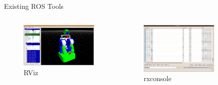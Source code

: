 \documentclass[compress]{beamer}
\begin{document}
\begin{frame}{Existing ROS Tools}
\begin{columns}
\begin{column}{.4\textwidth}
\begin{figure}[t]
    \centering
    \includegraphics[width=.9\textwidth]{images/RVizRobotModel.png}
    \caption{RViz}
\end{figure}
\end{column}%
\hfill%
\begin{column}{.4\textwidth}
\begin{figure}[t]
    \centering
    \includegraphics[width=.9\textwidth]{images/rxconsole.png}
    \caption{rxconsole}
\end{figure}
\end{column}%
\hfill%
\begin{column}{.4\textwidth}
\begin{figure}[t]
    \centering

\end{figure}
\end{column}
\end{columns}
\end{frame}
\end{document}
